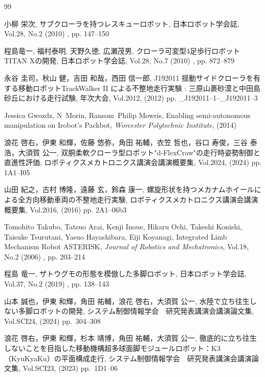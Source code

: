 \documentclass[uplatex,dvipdfmx]{jsarticle}
\begin{document}

\begin{thebibliography}{99}
  
小柳 栄次, サブクローラを持つレスキューロボット, 日本ロボット学会誌, Vol.28, No.2 (2010)  , pp. 147--150

程島竜一, 福村泰明, 天野久徳, 広瀬茂男, クローラ可変型4足歩行ロボットTITAN Xの開発, 日本ロボット学会誌, Vol.28, No.7 (2010)  , pp. 872--879

永谷 圭司，秋山 健，吉田 和哉，西田 信一郎, J192011 揺動サイドクローラを有する移動ロボットTrackWalker II による不整地走行実験 : 三原山裹砂漠と中田島砂丘における走行試験, 年次大会, Vol.2012,  (2012)  pp. \_J192011--1--\_J192011--3


Jessica Gwozdz, N~Morin, Ransom~Philip Mowris, Enabling semi-autonomous manipulation on Irobot’s Packbot, {\em Worcester Polytechnic Institute},  (2014)

浪花 啓右，伊東 和輝，佐藤 悠弥，角田 祐輔，衣笠 哲也，谷口 寿俊，三谷 泰浩，大須賀 公一, 双胴柔軟クローラ型ロボット"d-FlexCraw"の走行時姿勢制御と直進性評価, ロボティクスメカトロニクス講演会講演概要集, Vol.2024,  (2024)  pp. 1A1--I05

山田 紀之，古村 博隆，遠藤 玄，鈴森 康一, 螺旋形状を持つメカナムホイールによる全方向移動車両の不整地走行実験, ロボティクスメカトロニクス講演会講演概要集, Vol.2016,  (2016)  pp. 2A1--06b3

Tomohito Takubo, Tatsuo Arai, Kenji Inoue, Hikaru Ochi, Takeshi Konishi, Taisuke Tsurutani, Yasuo Hayashibara, Eiji Koyanagi, Integrated Limb Mechanism Robot ASTERISK, {\em Journal of Robotics and Mechatronics}, Vol.18, No.2 (2006)  , pp. 203--214

程島 竜一, ザトウグモの形態を模倣した多脚ロボット, 日本ロボット学会誌, Vol.37, No.2 (2019)  , pp. 138--143

山本 誠也，伊東 和輝，角田 祐輔，浪花 啓右，大須賀 公一, 水陸で立ち往生しない多脚ロボットの開発, システム制御情報学会　研究発表講演会講演論文集, Vol.SCI24,  (2024)  pp.~304--308

浪花 啓右，伊東 和輝，杉本 靖博，角田 祐輔，大須賀 公一, 徹底的に立ち往生しないことを目指した移動機構超多球面脚モジュールロボット：K3（KyuKyaKu）の平面構成走行, システム制御情報学会　研究発表講演会講演論文集, Vol.SCI23,  (2023)  pp.~1D1--06


\end{thebibliography}
\end{document}
